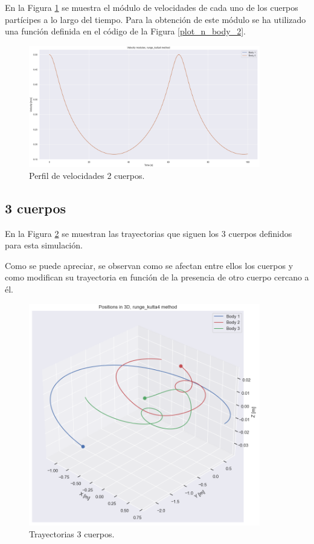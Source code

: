 \documentclass[12pt,a4paper]{article}
\begin{document}
En la Figura \ref{2_body_vel} se muestra el módulo de velocidades de cada uno de los cuerpos partícipes a lo largo del tiempo. Para la obtención de este módulo se ha utilizado una función definida en el código de la Figura \ref{plot_n_body_2}.
\begin{figure}[H]
	\centering
	\includegraphics[width=0.90\textwidth]{FIGURES/mil5/2nb_vel.png}
	\caption{Perfil de velocidades 2 cuerpos.}
	\label{2_body_vel}
\end{figure}


\subsection{3 cuerpos}
En la Figura \ref{3_body_3D} se muestran las trayectorias que siguen los 3 cuerpos definidos para esta simulación. 

Como se puede apreciar, se observan como se afectan entre ellos los cuerpos y como modifican su trayectoria en función de la presencia de otro cuerpo cercano a él.
\begin{figure}[H]
	\centering
	\includegraphics[width=0.90\textwidth]{FIGURES/mil5/3nb_plot3D.png}
	\caption{Trayectorias 3 cuerpos.}
	\label{3_body_3D}
\end{figure}
\end{document}
